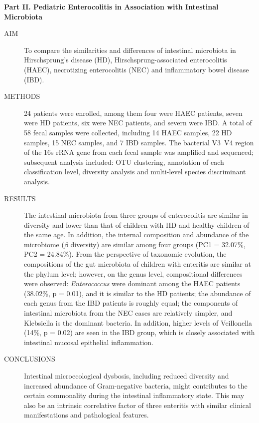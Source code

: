 \begin{englishabstract}
  \textbf{Part II. Pediatric Enterocolitis in Association with Intestinal Microbiota}
    \begin{description}
      \item[AIM] To compare the similarities and differences of intestinal microbiota in Hirschsprung's disease (HD), Hirschsprung-associated enterocolitis (HAEC), necrotizing enterocolitis (NEC) and inflammatory bowel disease (IBD).
      \item[METHODS] 24 patients were enrolled, among them four were HAEC patients, seven were HD patients, six were NEC patients, and severn were IBD. A total of 58 fecal samples were collected, including 14 HAEC samples, 22 HD samples, 15 NEC samples, and 7 IBD samples. The bacterial V3~V4 region of the 16s rRNA gene from each fecal sample was amplified and sequenced; subsequent analysis included: OTU clustering, annotation of each classification level, diversity analysis and multi-level species discriminant analysis.
      \item[RESULTS] The intestinal microbiota from three groups of enterocolitis are similar in diversity and lower than that of children with HD and healthy children of the same age. In addition, the internal composition and abundance of the microbiome ($\beta$ diversity) are similar among four groups (PC1 = 32.07\%, PC2 = 24.84\%). From the perspective of taxonomic evolution, the compositions of the gut microbiota of children with enteritis are similar at the phylum level; however, on the genus level, compositional differences were observed: \textit{Enterococcus} were dominant among the HAEC patients (38.02\%, p = 0.01), and it is similar to the HD patients; the abundance of each genus from the IBD patients is roughly equal; the components of intestinal microbiota from the NEC cases are relatively simpler, and Klebsiella is the dominant bacteria. In addition, higher levels of Veillonella (14\%, p = 0.02) are seen in the IBD group, which is closely associated with intestinal mucosal epithelial inflammation.
      \item[CONCLUSIONS] Intestinal microecological dysbosis, including reduced diversity and increased abundance of Gram-negative bacteria, might contributes to the certain commonality during the intestinal inflammatory state. This may also be an intrinsic correlative factor of three enteritis with similar clinical manifestations and pathological features.
    \end{description}

\end{englishabstract}
